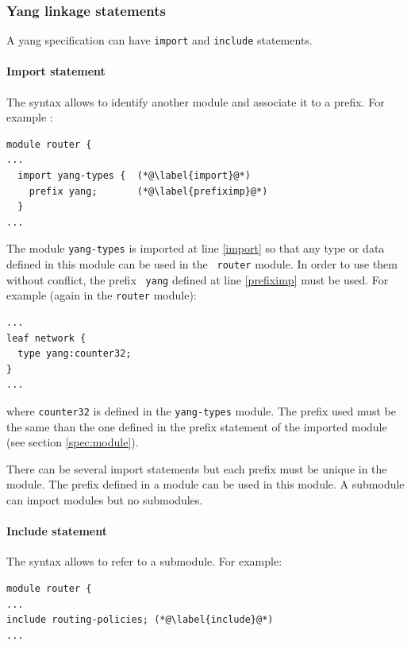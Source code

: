 \documentclass[a4paper]{article}
\begin{document}
\subsubsection{Yang linkage statements}

A  yang  specification  can   have  {\tt  import}  and  {\tt  include}
statements.

\paragraph{Import statement}

The syntax  allows to identify another module and associate  it to a
prefix. For example :

\begin{lstlisting}
module router {
...
  import yang-types {  (*@\label{import}@*)
    prefix yang;       (*@\label{prefiximp}@*)
  }
...
\end{lstlisting}

The module {\tt  yang-types} is imported at line  \ref{import} so that
any  type or  data defined  in this  module can  be used  in  the {\tt
router} module. In order to use them without conflict, the prefix {\tt
yang} defined at line \ref{prefiximp} must be used. For example (again
in the {\tt router} module):

\begin{lstlisting}
...
leaf network {
  type yang:counter32;
}
...
\end{lstlisting}

where {\tt counter32}  is defined in the {\tt  yang-types} module. The
prefix  used must  be the  same than  the one  defined in  the prefix
statement of the imported  module (see section \ref{spec:module}). 

 There can be several import statements but each prefix must be unique
in the  module.  The prefix  defined in a  module can be used  in this
module. A submodule can import modules but no submodules.


\paragraph{Include statement}
\label{spec:include}

The syntax allows to refer to a submodule. For example:

\begin{lstlisting}
module router {
...
include routing-policies; (*@\label{include}@*)
...
\end{lstlisting}
\end{document}
